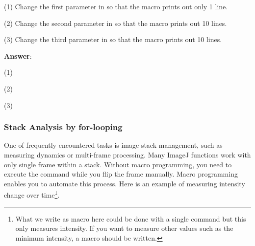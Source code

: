 \begin{indentexercise}{1}
(1) Change the first parameter in  so that the macro prints out only 1 line. 

(2) Change the second parameter in  so that the macro prints out 10 lines. 

(3) Change the third parameter in  so that the macro prints out 10 lines. 

\item \textbf{Answer}: 
	\item (1) 
	\item (2) 
	\item (3) 
\end{indentexercise}


\subsubsection{Stack Analysis by for-looping}
\label{sec:forloopStack}
One of frequently encountered tasks is image stack management, 
such as measuring dynamics or multi-frame processing. 
Many ImageJ functions work with only single frame within a stack. 
Without macro programming, you need to execute the command while you flip the frame manually. 
Macro programming enables you to automate this process. 
Here is an example of measuring intensity change over time\footnote{What we write as macro here could be done with a single command  but this only measures intensity. If you want to measure other values such as the minimum intensity, a macro should be written. }. 

\label{code:10}


